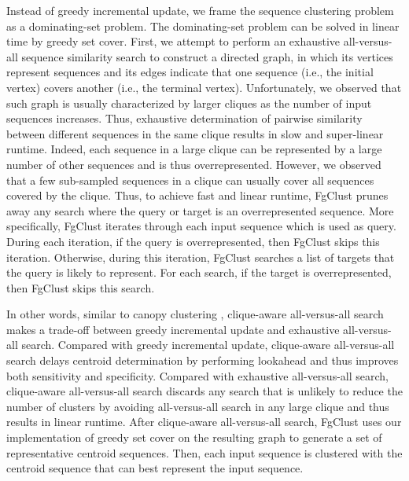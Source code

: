 \documentclass[11pt,letterpaper]{article}
\begin{document}
Instead of greedy incremental update, we frame the sequence clustering problem as a dominating-set problem.
The dominating-set problem can be solved in linear time by greedy set cover.
First, we attempt to perform an exhaustive all-versus-all sequence similarity search to construct a directed graph, in which its vertices represent sequences and its edges indicate that one sequence (i.e., the initial vertex) covers another (i.e., the terminal vertex).
Unfortunately, we observed that such graph is usually characterized by larger cliques as the number of input sequences increases.
Thus, exhaustive determination of pairwise similarity between different sequences in the same clique results in slow and super-linear runtime.
Indeed, each sequence in a large clique can be represented by a large number of other sequences and is thus overrepresented.
However, we observed that a few sub-sampled sequences in a clique can usually cover all sequences covered by the clique.
Thus, to achieve fast and linear runtime, FgClust prunes away any search where the query or target is an overrepresented sequence.
More specifically, FgClust iterates through each input sequence which is used as query.
During each iteration, if the query is overrepresented, then FgClust skips this iteration.
Otherwise, during this iteration, FgClust searches a list of targets that the query is likely to represent.
For each search, if the target is overrepresented, then FgClust skips this search.

In other words, similar to canopy clustering \citep{mccallum2000efficient}, clique-aware all-versus-all search makes a trade-off between greedy incremental update and exhaustive all-versus-all search. 
Compared with greedy incremental update, clique-aware all-versus-all search delays centroid determination by performing lookahead and thus improves both sensitivity and specificity.
Compared with exhaustive all-versus-all search, clique-aware all-versus-all search discards any search that is unlikely to reduce the number of clusters by avoiding all-versus-all search in any large clique and thus results in linear runtime.
After clique-aware all-versus-all search, FgClust uses our implementation of greedy set cover on the resulting graph to generate a set of representative centroid sequences.
Then, each input sequence is clustered with the centroid sequence that can best represent the input sequence.
\end{document}
